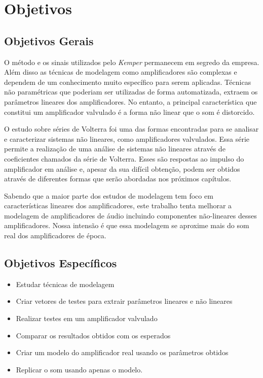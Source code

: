 \section*{Objetivos}
\subsection*{Objetivos Gerais}
O método e os sinais utilizados pelo \textit{Kemper} permanecem em segredo da empresa. Além disso as técnicas de modelagem como amplificadores são complexas e dependem de um conhecimento muito específico para serem aplicadas. Técnicas não paramétricas que poderiam ser utilizadas de forma automatizada, extraem os parâmetros lineares dos amplificadores. No entanto, a principal característica que constitui um amplificador valvulado é a forma não linear que o som é distorcido.

O estudo sobre séries de Volterra foi uma das formas encontradas para se analisar e caracterizar sistemas não lineares, como amplificadores valvulados. Essa série permite a realização de uma análise de sistemas não lineares através de coeficientes chamados  da série de Volterra. Esses  são respostas ao impulso do amplificador em análise e, apesar da sua difícil obtenção, podem ser obtidos através de diferentes formas que serão abordadas nos próximos capítulos.

Sabendo que a maior parte dos estudos de modelagem tem foco em 
características lineares dos amplificadores, este trabalho tenta melhorar a modelagem de amplificadores de áudio incluindo 
componentes não-lineares desses amplificadores. Nossa intensão é que essa modelagem se aproxime mais do som real 
dos amplificadores de época.

\subsection*{Objetivos Específicos}
\begin{itemize}
	\item Estudar técnicas de modelagem
	\item Criar vetores de testes para extrair parâmetros lineares e não lineares
	\item Realizar testes em um amplificador valvulado
	\item Comparar os resultados obtidos com os esperados
	\item Criar um modelo do amplificador real usando os parâmetros obtidos
	\item Replicar o som usando apenas o modelo.
\end{itemize}
